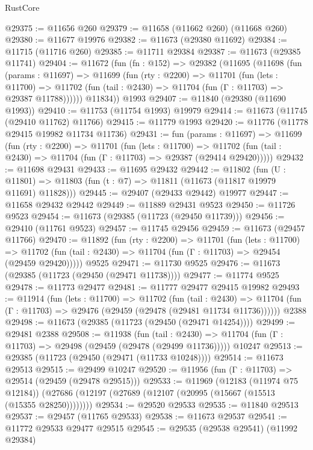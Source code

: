 \begin{lexlean}{RustCore}
\begin{coremodule}
@29375 := @11656 @260
@29379 := @11658 (@11662 @260) (@11668 @260)
@29380 := @11677 @19976
@29382 := @11673 (@29380 @11692)
@29384 := @11715 (@11716 @260)
@29385 := @11711 @29384
@29387 := @11673 (@29385 @11741)
@29404 := @11672
    (fun (fn : @152) =>
    @29382
      (@11695
        (@11698
          (fun (params : @11697) =>
          @11699
            (fun (rty : @2200) =>
            @11701
              (fun (lets : @11700) =>
              @11702 (fun (tail : @2430) => @11704 (fun (Γ : @11703) => @29387 @11788))))))
        @11834))
    @1993
@29407 := @11840 (@29380 (@11690 @1993))
@29410 := @11753 (@11754 @1993) @19979
@29414 := @11673 (@11745 (@29410 @11762) @11766)
@29415 := @11779 @1993
@29420 := @11776 (@11778 @29415 @19982 @11734 @11736)
@29431 := fun (params : @11697) =>
  @11699
    (fun (rty : @2200) =>
    @11701
      (fun (lets : @11700) =>
      @11702 (fun (tail : @2430) => @11704 (fun (Γ : @11703) => @29387 (@29414 @29420)))))
@29432 := @11698 @29431
@29433 := @11695 @29432
@29442 := @11802
    (fun (U : @11801) => @11803 (fun (t : @7) => @11811 (@11673 (@11817 @19979 @11691) @11828)))
@29445 := @29407 (@29433 @29442) @19977
@29447 := @11658 @29432 @29442
@29449 := @11889 @29431 @9523
@29450 := @11726 @9523
@29454 := @11673 (@29385 (@11723 (@29450 @11739)))
@29456 := @29410 (@11761 @9523)
@29457 := @11745 @29456
@29459 := @11673 (@29457 @11766)
@29470 := @11892
    (fun (rty : @2200) =>
    @11701
      (fun (lets : @11700) =>
      @11702 (fun (tail : @2430) => @11704 (fun (Γ : @11703) => @29454 (@29459 @29420)))))
    @9525
@29471 := @11730 @9525
@29476 := @11673 (@29385 (@11723 (@29450 (@29471 @11738))))
@29477 := @11774 @9525
@29478 := @11773 @29477
@29481 := @11777 @29477 @29415 @19982
@29493 := @11914
    (fun (lets : @11700) =>
    @11702
      (fun (tail : @2430) =>
      @11704 (fun (Γ : @11703) => @29476 (@29459 (@29478 (@29481 @11734 @11736))))))
    @2388
@29498 := @11673 (@29385 (@11723 (@29450 (@29471 @14254))))
@29499 := @29481 @2388
@29508 := @11938
    (fun (tail : @2430) => @11704 (fun (Γ : @11703) => @29498 (@29459 (@29478 (@29499 @11736)))))
    @10247
@29513 := @29385 (@11723 (@29450 (@29471 (@11733 @10248))))
@29514 := @11673 @29513
@29515 := @29499 @10247
@29520 := @11956 (fun (Γ : @11703) => @29514 (@29459 (@29478 @29515)))
@29533 := @11969
    (@12183 (@11974 @75 @12184))
    (@27686 (@12197 (@27689 (@12107 (@20995 (@15667 (@15513 (@15355 @28250))))))))
@29534 := @29520 @29533
@29535 := @11840 @29513
@29537 := @29457 (@11765 @29533)
@29538 := @11673 @29537
@29541 := @11772 @29533 @29477 @29515
@29545 := @29535 (@29538 @29541) (@11992 @29384)

\end{coremodule}
\end{lexlean}
